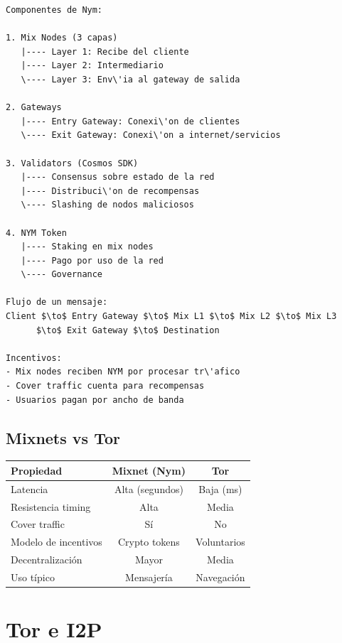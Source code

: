 \documentclass[11pt,a4paper,twoside]{book}
\begin{document}
\begin{example}
\begin{verbatim}
Componentes de Nym:

1. Mix Nodes (3 capas)
   |---- Layer 1: Recibe del cliente
   |---- Layer 2: Intermediario
   \---- Layer 3: Env\'ia al gateway de salida

2. Gateways
   |---- Entry Gateway: Conexi\'on de clientes
   \---- Exit Gateway: Conexi\'on a internet/servicios

3. Validators (Cosmos SDK)
   |---- Consensus sobre estado de la red
   |---- Distribuci\'on de recompensas
   \---- Slashing de nodos maliciosos

4. NYM Token
   |---- Staking en mix nodes
   |---- Pago por uso de la red
   \---- Governance

Flujo de un mensaje:
Client $\to$ Entry Gateway $\to$ Mix L1 $\to$ Mix L2 $\to$ Mix L3 
      $\to$ Exit Gateway $\to$ Destination

Incentivos:
- Mix nodes reciben NYM por procesar tr\'afico
- Cover traffic cuenta para recompensas
- Usuarios pagan por ancho de banda
\end{verbatim}
\end{example}

\subsection{Mixnets vs Tor}

\begin{center}
\begin{tabular}{lcc}
\toprule
\textbf{Propiedad} & \textbf{Mixnet (Nym)} & \textbf{Tor} \\
\midrule
Latencia & Alta (segundos) & Baja (ms) \\
Resistencia timing & Alta & Media \\
Cover traffic & S\'i & No \\
Modelo de incentivos & Crypto tokens & Voluntarios \\
Decentralizaci\'on & Mayor & Media \\
Uso t\'ipico & Mensajer\'ia & Navegaci\'on \\
\bottomrule
\end{tabular}
\end{center}

\section{Tor e I2P}
\label{sec:tor-i2p}
\end{document}
